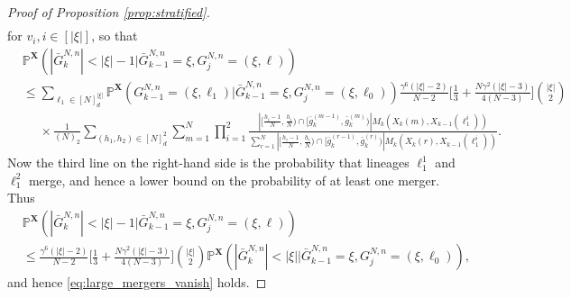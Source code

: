 \documentclass[a4paper,11pt]{article}
\theoremstyle{definition}
\newcommand{\bbP}{\mathbb{P}}
\newcommand{\bfX}{\mathbf{X}}
\begin{document}
\begin{proof}[Proof of Proposition \ref{prop:stratified}]
\begin{align*}
\end{align*}
for $v_i, i \in [ | \xi | ]$, so that
\begin{align*}
&\bbP^{ \bfX }( | \bar{ G }_k^{ N, n } | < | \xi | - 1 | \bar{ G }_{ k - 1 }^{ N, n } = \xi, G_j^{ N, n } = ( \xi, \ell ) ) \\
&\leq \sum_{ \ell_1 \in [ N ]_d^{ | \xi | } } \bbP^{ \bfX }( G_{ k - 1 }^{ N, n } = ( \xi, \ell_1 ) | \bar{ G }_{ k - 1 }^{ N, n } = \xi, G_j^{ N, n } = ( \xi, \ell_0 ) )  \frac{ \gamma^6 ( | \xi | - 2 ) }{ N - 2 } \Bigg[ \frac{ 1 }{ 3 } + \frac{ N \gamma^2 ( | \xi | - 3 ) }{ 4 ( N - 3 ) } \Bigg] \binom{ | \xi | }{ 2 } \\
&\phantom{\leq} \times \frac{ 1 }{ ( N )_2 } \sum_{ ( h_1, h_2 ) \in [ N ]_d^2 } \sum_{ m = 1 }^N \prod_{ i = 1 }^2 \frac{ | [ \frac{ h_i - 1 }{ N }, \frac{ h_i }{ N } ) \cap [ \bar{ g }_k^{ ( m - 1 ) }, \bar{ g }_k^{ ( m ) } ) | M_k( X_k( m ), X_{ k - 1 }( \ell_1^i ) ) }{ \sum_{ r = 1 }^N | [ \frac{ h_i - 1 }{ N }, \frac{ h_i }{ N } ) \cap [ \bar{ g }_k^{ ( r - 1 ) }, \bar{ g }_k^{ ( r ) } ) | M_k( X_k( r ), X_{ k - 1 }( \ell_1^i ) ) }.
\end{align*}
Now the third line on the right-hand side is the probability that lineages $\ell_1^1$ and $\ell_1^2$ merge, and hence a lower bound on the probability of at least one merger.
Thus
\begin{align*}
&\bbP^{ \bfX }( | \bar{ G }_k^{ N, n } | < | \xi | - 1 | \bar{ G }_{ k - 1 }^{ N, n } = \xi, G_j^{ N, n } = ( \xi, \ell ) ) \\
&\leq \frac{ \gamma^6 ( | \xi | - 2 ) }{ N - 2 } \Bigg[ \frac{ 1 }{ 3 } + \frac{ N \gamma^2 ( | \xi | - 3 ) }{ 4 ( N - 3 ) } \Bigg] \binom{ | \xi | }{ 2 } \bbP^{ \bfX }( | \bar{ G }_k^{ N, n } | < | \xi | | \bar{ G }_{ k - 1 }^{ N, n } = \xi, G_j^{ N, n } = ( \xi, \ell_0 ) ),
\end{align*}
and hence \eqref{eq:large_mergers_vanish} holds.


\end{proof}
\end{document}
